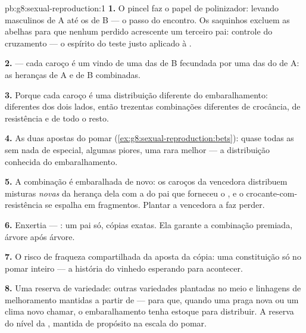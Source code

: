 \begin{solution}{pb:g8:sexual-reproduction:1}
\textbf{1.} O pincel faz o papel de polinizador: levando 
masculinos de A até os  de B --- o passo do encontro. Os
saquinhos excluem as abelhas para que nenhum  perdido acrescente
um terceiro pai: controle do cruzamento --- o espírito do teste justo
aplicado à .

\textbf{2.}  --- cada caroço é um  vindo de uma das
 de B fecundada por uma das  do
 de A: as heranças de A e de B combinadas.

\textbf{3.} Porque cada caroço é uma distribuição diferente do
embaralhamento:  diferentes dos dois lados, então trezentas
combinações diferentes de crocância, de resistência e de todo o resto.

\textbf{4.} As duas apostas do pomar
(\cref{ex:g8:sexual-reproduction:bets}): quase todas as  sem
nada de especial, algumas piores, uma rara melhor --- a distribuição
conhecida do embaralhamento.

\textbf{5.} A combinação é embaralhada de novo: os caroços da
vencedora distribuem misturas \emph{novas} da herança dela com a do
pai que forneceu o , e o crocante-com-resistência se espalha em
fragmentos. Plantar a vencedora a faz perder.

\textbf{6.} Enxertia --- : um pai só, cópias
exatas. Ela garante a combinação premiada, árvore após árvore.

\textbf{7.} O risco de fraqueza compartilhada da aposta da cópia: uma
constituição só no pomar inteiro --- a história do vinhedo esperando
para acontecer.

\textbf{8.} Uma reserva de variedade: outras variedades plantadas no
meio e linhagens de melhoramento mantidas a partir de  --- para
que, quando uma praga nova ou um clima novo chamar, o embaralhamento
tenha estoque para distribuir. A reserva do nível da , mantida
de propósito na escala do pomar.


\end{solution}
